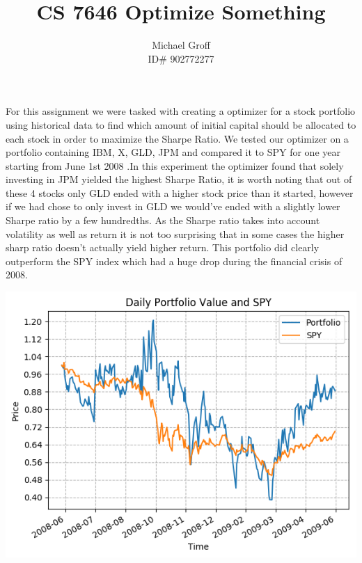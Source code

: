\documentclass[12pt]{article}
\begin{document}
\title{CS 7646 Optimize Something}
\author{Michael Groff \\ ID\# 902772277}
\maketitle
For this assignment we were tasked with creating a optimizer for a stock portfolio using historical data to find which amount of initial capital should be allocated to each stock in order to maximize the Sharpe Ratio. We tested our optimizer on a portfolio containing IBM, X, GLD, JPM and compared it to SPY for one year starting from June 1st 2008 .In this experiment the optimizer found that solely investing in JPM yielded the highest Sharpe Ratio, it is worth noting that out of these 4 stocks only GLD ended with a higher stock price than it started, however if we had chose to only invest in GLD we would've ended with a slightly lower Sharpe ratio by a few hundredths. As the Sharpe ratio takes into account volatility as well as return it is not too surprising that in some cases the higher sharp ratio doesn't actually yield higher return. This portfolio did clearly outperform the SPY index which had a huge drop during the financial crisis of 2008.
\begin{center}
\includegraphics[scale=1]{compare.png}
\end{center}
\end{document}

